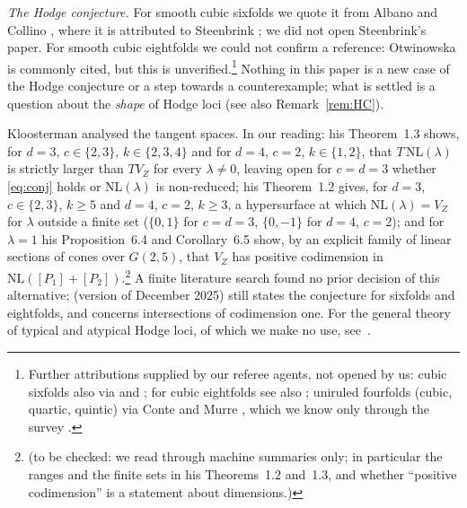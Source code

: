 \documentclass[10pt]{article}
\numberwithin{equation}{section}
\theoremstyle{remark}
\newcommand{\NL}{\mathrm{NL}}
\newcommand{\VZ}{V_Z}
\newcommand{\tbc}[1]{\footnote{(to be checked: #1)}}
\begin{document}
\emph{The Hodge conjecture.} For smooth cubic sixfolds we quote it from Albano and Collino
\cite[Prop.~2.2]{AC}, where it is attributed to Steenbrink \cite{St}; we did not open Steenbrink's paper. For
smooth cubic eightfolds we could not confirm a reference: Otwinowska \cite{Ot} is commonly cited, but this is
unverified.\footnote{Further attributions supplied by our referee agents, not opened by us: cubic sixfolds also
via \cite{ELV} and \cite{BS}; for cubic eightfolds see also \cite{Vi}; uniruled fourfolds (cubic, quartic,
quintic) via Conte and Murre \cite{CM}, which we know only through the survey
\cite[Thm.~2.19, Cor.~2.20]{Sur}.} Nothing in this paper is
a new case of the Hodge conjecture or a step towards a counterexample; what is settled is a question about the
\emph{shape} of Hodge loci (see also Remark~\ref{rem:HC}).

Kloosterman \cite{Kl1} analysed the tangent spaces. In our reading: his Theorem~1.3 shows, for $d=3$,
$c\in\{2,3\}$, $k\in\{2,3,4\}$ and for $d=4$, $c=2$, $k\in\{1,2\}$, that $T\,\NL(\lambda)$ is strictly larger than
$T\VZ$ for every $\lambda\ne0$, leaving open for $c=d=3$ whether \eqref{eq:conj} holds or $\NL(\lambda)$ is
non-reduced; his Theorem~1.2 gives, for $d=3$, $c\in\{2,3\}$, $k\ge5$ and $d=4$, $c=2$, $k\ge3$, a hypersurface at
which $\NL(\lambda)=\VZ$ for $\lambda$ outside a finite set ($\{0,1\}$ for $c=d=3$, $\{0,-1\}$ for $d=4$, $c=2$);
and for $\lambda=1$ his
Proposition~6.4 and Corollary~6.5 show, by an explicit family of linear sections of cones over $G(2,5)$, that
$\VZ$ has positive codimension in $\NL([P_1]+[P_2])$.\tbc{we read \cite{Mo1,Mo2,Mo3,Kl1,Kl2} through machine
summaries only; in particular the ranges and the finite sets in his Theorems~1.2 and~1.3, and whether
``positive codimension'' is a statement about dimensions.} A finite literature search found no prior decision of
this alternative; \cite{Mo3} (version of December 2025) still states the conjecture for sixfolds and eightfolds,
and \cite{Kl2} concerns intersections of codimension one. For the general theory of typical and atypical Hodge
loci, of which we make no use, see~\cite{BKU}.
\end{document}
